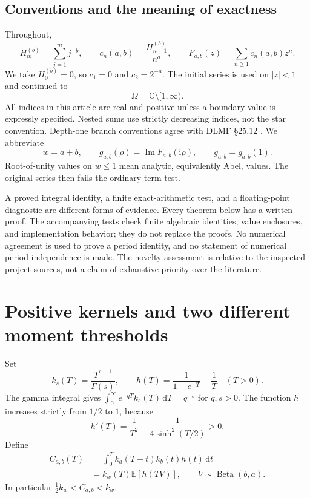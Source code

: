 \documentclass[11pt]{article}
\numberwithin{equation}{section}
\theoremstyle{definition}
\theoremstyle{remark}
\DeclareMathOperator{\Impart}{Im}
\newcommand{\dd}{\,\mathrm d}
\newcommand{\ii}{\mathrm i}
\newcommand{\C}{\mathbb C}
\newcommand{\E}{\mathbb E}
\newcommand{\cut}{\Omega}
\begin{document}
\subsection{Conventions and the meaning of exactness}
Throughout,
\begin{equation}\label{eq:definitions}
 H_m^{(b)}=\sum_{j=1}^m j^{-b},\qquad
 c_n(a,b)=\frac{H_{n-1}^{(b)}}{n^a},\qquad
 F_{a,b}(z)=\sum_{n\ge1}c_n(a,b)z^n.
\end{equation}
We take $H_0^{(b)}=0$, so $c_1=0$ and $c_2=2^{-a}$.
The initial series is used on $|z|<1$ and continued to
\[\cut=\C\setminus[1,\infty).\]
All indices in this article are real and positive unless a boundary
value is expressly specified. Nested sums use strictly decreasing
indices, not the star convention. Depth-one branch conventions agree
with DLMF \S25.12 \cite{dlmf-polylog}. We abbreviate
\[
 w=a+b,\qquad g_{a,b}(\rho)=\Impart F_{a,b}(\ii\rho),\qquad
 g_{a,b}=g_{a,b}(1).
\]
Root-of-unity values on $w\le1$ mean analytic, equivalently Abel,
values. The original series then fails the ordinary term test.

A proved integral identity, a finite exact-arithmetic test, and a
floating-point diagnostic are different forms of evidence. Every theorem
below has a written proof. The accompanying tests check finite algebraic
identities, value enclosures, and implementation behavior; they do not
replace the proofs. No numerical agreement is used to prove a period
identity, and no statement of numerical period independence is made.
The novelty assessment is relative to the inspected project sources,
not a claim of exhaustive priority over the literature.

\section{Positive kernels and two different moment thresholds}
\label{sec:kernels}
Set
\begin{equation}\label{eq:k-h}
 k_s(T)=\frac{T^{s-1}}{\Gamma(s)},\qquad
 h(T)=\frac1{1-e^{-T}}-\frac1T\quad(T>0).
\end{equation}
The gamma integral gives
$\int_0^\infty e^{-qT}k_s(T)\dd T=q^{-s}$ for $q,s>0$.
The function $h$ increases strictly from $1/2$ to $1$, because
\[
 h'(T)=\frac1{T^2}-\frac1{4\sinh^2(T/2)}>0.
\]
Define
\begin{align}
 C_{a,b}(T)
 &=\int_0^T k_a(T-t)k_b(t)h(t)\dd t\label{eq:C-def}\\
 &=k_w(T)\E[h(TV)],\qquad V\sim\operatorname{Beta}(b,a).
 \label{eq:C-beta}
\end{align}
In particular $\tfrac12 k_w<C_{a,b}<k_w$.
\end{document}

